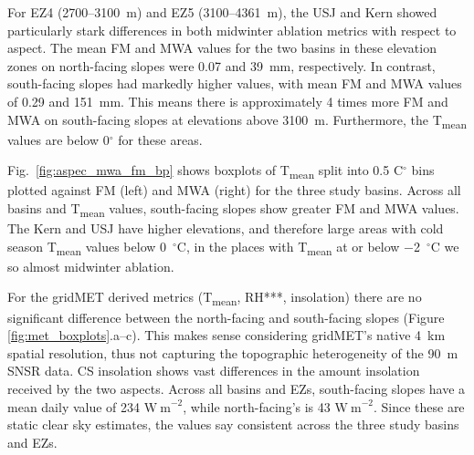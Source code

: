 For EZ4 (2700--3100~m) and EZ5 (3100--4361~m), the USJ and Kern showed particularly stark differences in both midwinter ablation metrics with respect to aspect. The mean FM and MWA values for the two basins in these elevation zones on north-facing slopes were 0.07 and 39~mm, respectively. In contrast, south-facing slopes had markedly higher values, with mean FM and MWA values of 0.29 and 151~mm. This means there is approximately 4 times more FM and MWA on south-facing slopes at elevations above 3100~m. Furthermore, the T\textsubscript{mean} values are below 0$^{\circ}$ for these areas.

Fig.~\ref{fig:aspec_mwa_fm_bp} shows boxplots of T\textsubscript{mean} split into 0.5 C$^{\circ}$ bins plotted against FM (left) and MWA (right) for the three study basins. Across all basins and T\textsubscript{mean} values, south-facing slopes show greater FM and MWA values.  The Kern and USJ have higher elevations, and therefore large areas with cold season T\textsubscript{mean} values below 0~$^{\circ}$C, in the places with T\textsubscript{mean} at or below $-$2~$^{\circ}$C we so almost midwinter ablation. 

For the gridMET derived metrics (T\textsubscript{mean}, RH***, insolation) there are no significant difference between the north-facing and south-facing slopes (Figure \ref{fig:met_boxplots}.a--c). This makes sense considering gridMET's native 4~km spatial resolution, thus not capturing the topographic heterogeneity of the 90~m SNSR data. CS insolation shows vast differences in the amount insolation received by the two aspects. Across all basins and EZs, south-facing slopes have a mean daily value of 234 $\mathrm{W~m}^{-2}$, while north-facing's is 43 $\mathrm{W~m}^{-2}$. Since these are static clear sky estimates, the values say consistent across the three study basins and EZs.

